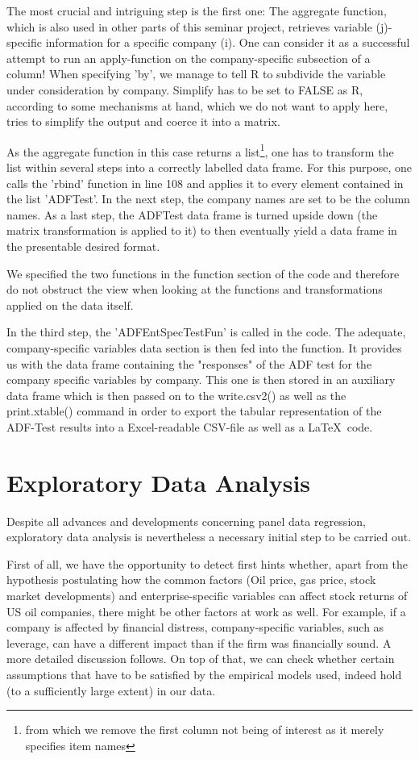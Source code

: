 \documentclass[a4paper]{article}
\begin{document}
The most crucial and intriguing step is the first one: The aggregate function, which is also used in other parts of this seminar project, retrieves variable (j)-specific information for a specific company (i). One can consider it as a successful attempt to run an apply-function on the company-specific subsection of a column! When specifying 'by', we manage to tell R to subdivide the variable under consideration by company. Simplify has to be set to FALSE as R, according to some mechanisms at hand, which we do not want to apply here, tries to simplify the output and coerce it into a matrix.

As the aggregate function in this case returns a list\footnote{from which we remove the first column not being of interest as it merely specifies item names}, one has to transform the list within several steps into a correctly labelled data frame. For this purpose, one calls the 'rbind' function in line 108 and applies it to every element contained in the list 'ADFTest'. In the next step, the company names are set to be the column names. As a last step, the ADFTest data frame is turned upside down (the matrix transformation is applied to it) to then eventually yield a data frame in the presentable desired format.

We specified the two functions in the function section of the code and therefore do not obstruct the view when looking at the functions and transformations applied on the data itself.

In the third step, the 'ADFEntSpecTestFun' is called in the code. The adequate, company-specific variables data section is then fed into the function. It provides us with the data frame containing the "responses" of the ADF test for the company specific variables by company. This one is then stored in an auxiliary data frame which is then passed on to the write.csv2() as well as the print.xtable() command in order to export the tabular representation of the ADF-Test results into a Excel-readable CSV-file as well as a \LaTeX\ code. 

\section{Exploratory Data Analysis}

Despite all advances and developments concerning panel data regression, exploratory data analysis is nevertheless a necessary initial step to be carried out. 

First of all, we have the opportunity to detect first hints whether, apart from the hypothesis postulating how the common factors (Oil price, gas price, stock market developments) and enterprise-specific variables can affect stock returns of US oil companies, there might be other factors at work as well. For example, if a company is affected by financial distress, company-specific variables, such as leverage, can have a different impact than if the firm was financially sound. A more detailed discussion follows. On top of that, we can check whether certain assumptions that have to be satisfied by the empirical models used, indeed hold (to a sufficiently large extent) in our data. 
\end{document}
